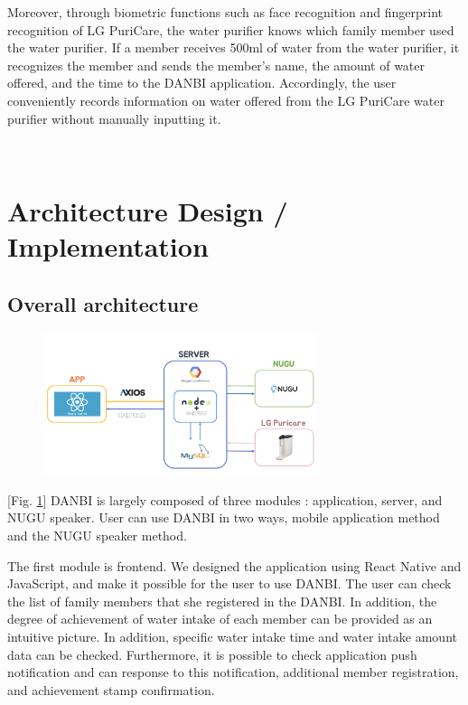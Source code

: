 \documentclass[conference]{IEEEtran}
\begin{document}
Moreover, through biometric functions such as face recognition and fingerprint recognition of LG PuriCare, the water purifier knows which family member used the water purifier. If a member receives 500ml of water from the water purifier, it recognizes the member and sends the member's name, the amount of water offered, and the time to the DANBI application. Accordingly, the user conveniently records information on water offered from the LG PuriCare water purifier without manually inputting it.

\ 

\section{Architecture Design / Implementation}

\subsection{Overall architecture}\label{AA}
\setlength{\parindent}{2ex}
\par \begin{figure}[h!]
\includegraphics[width=8cm]{image/architecture.png}
\centering
\caption{}
\label{fig:architecture}
\end{figure}

[Fig. \ref{fig:architecture}] DANBI is largely composed of three modules : application, server, and NUGU speaker. User can use DANBI in two ways, mobile application method and the NUGU speaker method.

The first module is frontend. We designed the application using React Native and JavaScript, and make it possible for the user to use DANBI. The user can check the list of family members that she registered in the DANBI. In addition, the degree of achievement of water intake of each member can be provided as an intuitive picture. In addition, specific water intake time and water intake amount data can be checked. Furthermore, it is possible to check application push notification and can response to this notification, additional member registration, and achievement stamp confirmation.
\end{document}
